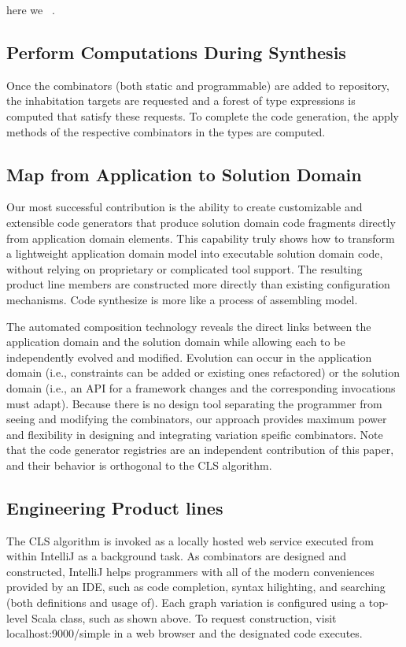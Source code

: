 here we ~\cite{Schwagerl:2016:STS:2970276.2970288}.

 \subsection{Perform Computations During Synthesis}

Once the combinators (both static and programmable) are added to repository, the inhabitation targets are requested
and a forest of type expressions is computed that satisfy these requests. To complete the code generation, the apply
methods of the respective combinators in the types are computed.


 \subsection{Map from Application to Solution Domain}

 Our most successful contribution is the ability to create customizable and extensible code generators that produce
 solution domain code fragments directly from application domain elements.
 This capability truly shows how to transform a lightweight application domain model into executable solution domain
 code, without relying on proprietary or complicated tool support. The resulting product line members are constructed
 more directly than existing configuration mechanisms. Code synthesize is more like a process of assembling
 model.

 The automated composition technology reveals the direct links between the application domain and the solution
 domain while allowing each to be independently evolved and modified. Evolution can occur in the application domain
 (i.e., constraints can be added or existing ones refactored) or the solution domain (i.e., an API for a framework
 changes and the corresponding invocations must adapt). Because there is no design tool separating the programmer
 from seeing and modifying the combinators, our approach provides maximum power and flexibility in designing and
 integrating variation speific combinators. Note that the code generator registries are an independent contribution
 of this paper, and their behavior is orthogonal to the CLS algorithm.

 \subsection{Engineering Product lines}

 The CLS algorithm is invoked as a locally hosted web service executed from within IntelliJ as a background task.
 As combinators are designed and constructed, IntelliJ helps programmers with all of the modern conveniences
 provided by an IDE, such as code completion, syntax hilighting, and searching (both definitions and usage of).
 Each graph variation is configured using a top-level Scala class, such as shown above.
 To request construction, visit localhost:9000/simple in a web browser and the designated code executes.


